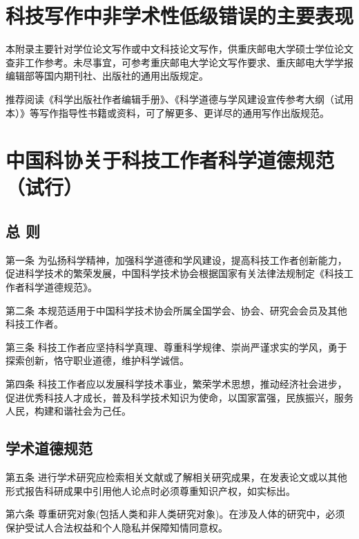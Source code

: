 \documentclass{cqupt_thesis}
\begin{document}
    \begin{reference}
        
    \end{reference}


    \beginappendix


    \chapter{科技写作中非学术性低级错误的主要表现}
    
    本附录主要针对学位论文写作或中文科技论文写作，供重庆邮电大学硕士学位论文查非工作参考。未尽事宜，可参考重庆邮电大学论文写作要求、重庆邮电大学学报编辑部等国内期刊社、出版社的通用出版规定。
    
    推荐阅读《科学出版社作者编辑手册》、《科学道德与学风建设宣传参考大纲（试用本）》等写作指导性书籍或资料，可了解更多、更详尽的通用写作出版规范。
    
    \chapter{中国科协关于科技工作者科学道德规范（试行）}
    \section{总 则}
    第一条 为弘扬科学精神，加强科学道德和学风建设，提高科技工作者创新能力，促进科学技术的繁荣发展，中国科学技术协会根据国家有关法律法规制定《科技工作者科学道德规范》。
    
    第二条 本规范适用于中国科学技术协会所属全国学会、协会、研究会会员及其他科技工作者。
    
    第三条 科技工作者应坚持科学真理、尊重科学规律、崇尚严谨求实的学风，勇于探索创新，恪守职业道德，维护科学诚信。
    
    第四条 科技工作者应以发展科学技术事业，繁荣学术思想，推动经济社会进步，促进优秀科技人才成长，普及科学技术知识为使命，以国家富强，民族振兴，服务人民，构建和谐社会为己任。
    
    \section{学术道德规范}
    
    第五条 进行学术研究应检索相关文献或了解相关研究成果，在发表论文或以其他形式报告科研成果中引用他人论点时必须尊重知识产权，如实标出。
    
    第六条 尊重研究对象(包括人类和非人类研究对象)。在涉及人体的研究中，必须保护受试人合法权益和个人隐私并保障知情同意权。
    
\end{document}
